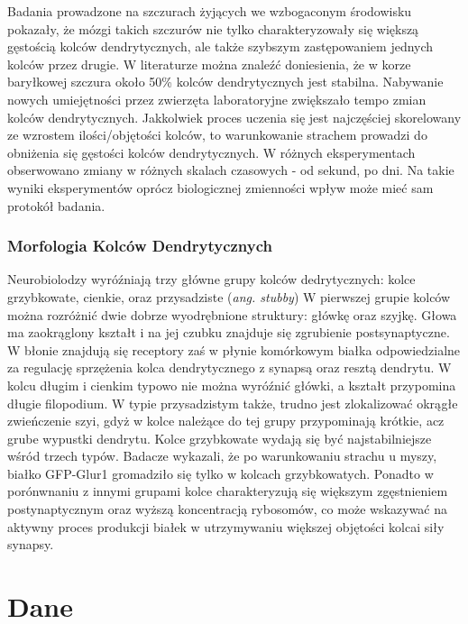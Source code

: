 \documentclass{article}
\begin{document}
Badania prowadzone na szczurach żyjących we wzbogaconym środowisku pokazały, że mózgi takich szczurów nie tylko charakteryzowały się większą gęstością kolców dendrytycznych, ale także szybszym zastępowaniem jednych kolców przez drugie.
W literaturze\citep{Sala2014} można znaleźć doniesienia, że w korze baryłkowej szczura około 50\% kolców dendrytycznych jest stabilna.
Nabywanie nowych umiejętności przez zwierzęta laboratoryjne zwiększało tempo zmian kolców dendrytycznych.
Jakkolwiek proces uczenia się jest najczęściej skorelowany ze wzrostem ilości/objętości kolców, to warunkowanie strachem prowadzi do obniżenia się gęstości kolców dendrytycznych.
W różnych eksperymentach obserwowano zmiany w różnych skalach czasowych - od sekund, po dni.
Na takie wyniki eksperymentów oprócz biologicznej zmienności wpływ może mieć sam protokół badania.


\subsubsection{Morfologia Kolców Dendrytycznych}
Neurobiolodzy wyróźniają trzy główne grupy kolców dedrytycznych: kolce grzybkowate, cienkie, oraz przysadziste (\emph{ang. stubby})
W pierwszej grupie kolców można rozróżnić dwie dobrze wyodrębnione struktury: główkę oraz szyjkę.
Głowa ma zaokrąglony kształt i na jej czubku znajduje się zgrubienie postsynaptyczne.
W błonie znajdują się receptory zaś w płynie komórkowym białka odpowiedzialne za regulację sprzężenia kolca dendrytycznego z synapsą oraz resztą dendrytu. %
W kolcu długim i cienkim typowo nie można wyróźnić główki, a kształt przypomina długie filopodium.
W typie przysadzistym także, trudno jest zlokalizować okrągłe zwieńczenie szyi, gdyż w kolce należące do tej grupy przypominają krótkie, acz grube wypustki dendrytu. %
Kolce grzybkowate wydają się być najstabilniejsze wśród trzech typów.
Badacze wykazali, że po warunkowaniu strachu u myszy, białko GFP-Glur1 gromadziło się tylko w kolcach grzybkowatych.
Ponadto w porónwnaniu z innymi grupami kolce charakteryzują się większym zgęstnieniem postynaptycznym oraz wyższą koncentracją rybosomów, co może wskazywać na aktywny proces produkcji białek w utrzymywaniu większej objętości kolcai siły synapsy\cite{Sala2014}.

\section{Dane}
\end{document}
